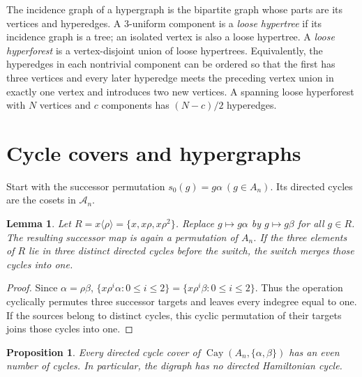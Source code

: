 \documentclass[4pt]{article} %
\newtheorem{lemma}[theorem]{Lemma}
\newtheorem{proposition}[theorem]{Proposition}
\newcommand{\la}{\langle}
\newcommand{\ra}{\rangle}
\begin{document}
The incidence graph of a hypergraph is the bipartite graph whose parts are
its vertices and hyperedges. A $3$-uniform component is a \emph{loose
hypertree} if its incidence graph is a tree; an isolated vertex is also a
loose hypertree. A \emph{loose hyperforest} is a vertex-disjoint union of
loose hypertrees. Equivalently, the hyperedges in each nontrivial component
can be ordered so that the first has three vertices and every later hyperedge
meets the preceding vertex union in exactly one vertex and introduces two
new vertices. A spanning loose hyperforest with $N$ vertices and $c$
components has $(N-c)/2$ hyperedges.

\section{Cycle covers and hypergraphs}\label{sec:reduction}

Start with the successor permutation
$
 s_0(g)=g\alpha~(g\in A_n).
$
Its directed cycles are the cosets in $\mathcal A_n$.

\begin{lemma}\label{lem:switch}
Let $R=x\la\rho\ra=\{x,x\rho,x\rho^2\}$. Replace
$g\mapsto g\alpha$ by $g\mapsto g\beta$ for all $g\in R$. The resulting
successor map is again a permutation of $A_n$. If the three elements of $R$
lie in three distinct directed cycles before the switch, the switch merges
those cycles into one.
\end{lemma}

\begin{proof}
Since $\alpha=\rho\beta$,
$
 \{x\rho^i\alpha:0\leq i\leq2\}
   =\{x\rho^i\beta:0\leq i\leq2\}.
$
Thus the operation cyclically permutes three successor targets and leaves
every indegree equal to one. If the sources belong to distinct cycles, this
cyclic permutation of their targets joins those cycles into one.
\end{proof}

\begin{proposition}\label{prop:parity}
Every directed cycle cover of
$\operatorname{Cay}(A_n,\{\alpha,\beta\})$ has an even number of cycles.
In particular, the digraph has no directed Hamiltonian cycle.
\end{proposition}
\end{document}
